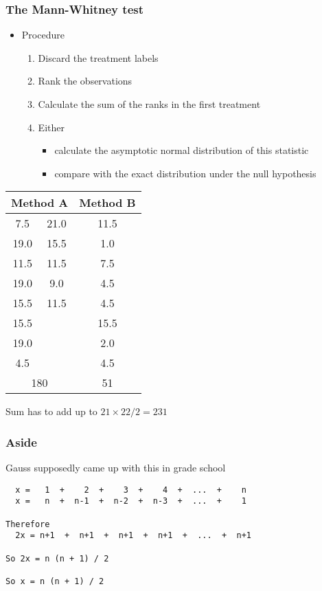 \documentclass[aspectratio=169]{beamer}
\begin{document}
\begin{frame}\frametitle{The Mann-Whitney test}
\begin{itemize}
\item Procedure
  \begin{enumerate}
  \item Discard the treatment labels
  \item Rank the observations 
  \item Calculate the sum of the ranks in the first treatment
  \item Either 
    \begin{itemize}
    \item calculate the asymptotic normal distribution of 
      this statistic
    \item compare with the exact distribution under the null hypothesis
    \end{itemize}
\end{enumerate}
\end{itemize}
\end{frame}

\begin{frame}
\begin{center}
\ttfamily
  \begin{tabular}{|cc|c|} \hline
\multicolumn{2}{|c|}{Method A} & Method B \\ \hline
 7.5  & 21.0  & 11.5  \\
19.0  & 15.5  &  1.0  \\
11.5  & 11.5  &  7.5  \\
19.0  &  9.0  &  4.5  \\
15.5  & 11.5  &  4.5  \\
15.5  &       & 15.5  \\
19.0  &       &  2.0  \\
 4.5  &       &  4.5  \\ \hline
\multicolumn{2}{|c|}{180} & 51 \\ \hline
  \end{tabular}
\end{center}
Sum has to add up to $21 \times 22 / 2 = 231$ \normalsize \normalfont
\end{frame}

\begin{frame}[fragile]\frametitle{Aside}
Gauss supposedly came up with this in grade school
\begin{verbatim}
  x =   1  +    2  +    3  +    4  +  ...  +    n
  x =   n  +  n-1  +  n-2  +  n-3  +  ...  +    1

Therefore
  2x = n+1  +  n+1  +  n+1  +  n+1  +  ...  +  n+1

So 2x = n (n + 1) / 2

So x = n (n + 1) / 2
\end{verbatim}
\end{frame}
\end{document}
